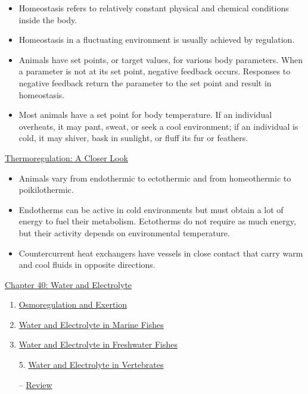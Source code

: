 \documentclass[12pt,letterpaper]{article}
\newcommand{\thetitle}{\hypertarget{home}{Animals and Ecology}}
\begin{document}
    \begin{itemize}
            \item Homeostasis refers to relatively constant physical and chemical conditions inside the body. 
            \item Homeostasis in a fluctuating environment is usually achieved by regulation. 
            \item Animals have set points, or target values, for various body parameters. When a parameter is not at its set point, negative feedback occurs. Responses to negative feedback return the parameter to the set point and result in homeostasis. 
            \item Most animals have a set point for body temperature. If an individual overheats, it may pant, sweat, or seek a cool environment; if an individual is cold, it may shiver, bask in sunlight, or fluff its fur or feathers.
        \end{itemize}
    \hyperlink{39.5}{Thermoregulation: A Closer Look}
    \begin{itemize}
            \item Animals vary from endothermic to ectothermic and from homeothermic to poikilothermic. 
            \item Endotherms can be active in cold environments but must obtain a lot of energy to fuel their metabolism. Ectotherms do not require as much energy, but their activity depends on environmental temperature. 
            \item Countercurrent heat exchangers have vessels in close contact that carry warm and cool fluids in opposite directions.
    \end{itemize}        
  


\clearpage

\renewcommand{\thetitle}{\hypertarget{40}{Water and Electrolye Balance}}
\hypertarget{40}{}
\setcounter{section}{40}

\begin{chapbox}{\hyperlink{home}{Chapter 40: Water and Electrolyte}}
    \begin{enumerate}
        \item \hyperlink{40.1}{Osmoregulation and Exertion}
        \item \hyperlink{40.2}{Water and Electrolyte in Marine Fishes}
        \item \hyperlink{40.3}{Water and Electrolyte in Freshwater Fishes}
        \item [5.] \hyperlink{40.5}{Water and Electrolyte in Vertebrates}
        \item [--] \hyperlink{40.r}{Review}
    \end{enumerate}
\end{chapbox}
\end{document}
